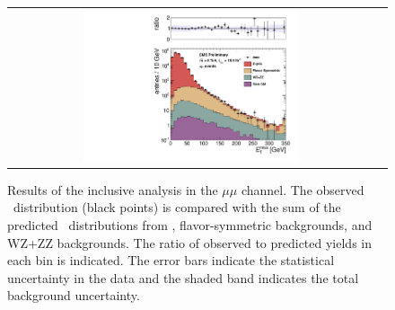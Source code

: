 \clearpage

\begin{figure}[!h]
\begin{center}
\begin{tabular}{cc}
\includegraphics[width=0.6\textwidth]{plots/pfmet_mm_19p5fb.pdf}
\end{tabular}
\caption{Results of the inclusive analysis in the $\mu\mu$ channel. The observed \MET\ distribution (black points) is compared with the sum of the predicted \MET\
distributions from \zjets, flavor-symmetric backgrounds, and WZ+ZZ backgrounds. The ratio of observed to predicted yields in each bin is
indicated. The error bars indicate the statistical uncertainty in the data and the shaded band indicates the total background uncertainty.
\label{fig:results_incl_mm}
}
\end{center}
\end{figure}

